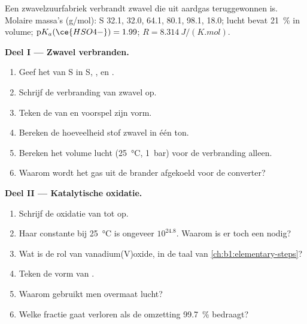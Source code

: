 \begin{problem}
\label{pb:b1:p-block-16-18:1}
Een zwavelzuurfabriek verbrandt zwavel die uit aardgas teruggewonnen is.
Molaire massa's (\unit{g/mol}): S 32.1,  32.0,  64.1,
 80.1,  98.1,  18.0; lucht bevat
\qty{21}{\percent}  in volume; $\mathrm{p}K_a(\ce{HSO4-}) = 1.99$;
$R =
\qty{8.314}{J/(K.mol)}$.

\medskip
\noindent\textbf{Deel I --- Zwavel verbranden.}
\begin{enumerate}
  \item Geef het  van S in S, ,  en
        .
  \item Schrijf de verbranding van zwavel op.
  \item Teken de  van  en voorspel zijn vorm.
  \item Bereken de hoeveelheid stof zwavel in één ton.
  \item Bereken het volume lucht (\qty{25}{\celsius}, \qty{1}{bar}) voor
        de verbranding alleen.
  \item Waarom wordt het gas uit de brander afgekoeld voor de converter?
\end{enumerate}

\medskip
\noindent\textbf{Deel II --- Katalytische oxidatie.}
\begin{enumerate}[resume]
  \item Schrijf de oxidatie van  tot  op.
  \item Haar constante bij \qty{25}{\celsius} is ongeveer $10^{24.8}$.
        Waarom is er toch een  nodig?
  \item Wat is de rol van vanadium(V)oxide, in de taal van
        \cref{ch:b1:elementary-steps}?
  \item Teken de vorm van .
  \item Waarom gebruikt men overmaat lucht?
  \item Welke fractie  gaat verloren als de omzetting
        \qty{99.7}{\percent} bedraagt?
\end{enumerate}


\end{problem}
